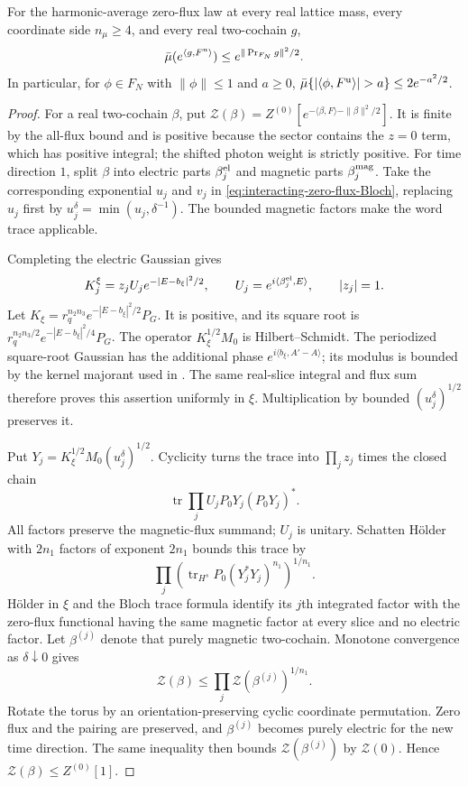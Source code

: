 \documentclass[11pt,letterpaper,reqno]{amsart}
\DeclareMathOperator{\tr}{tr}
\begin{document}
\begin{proposition}\label{prop:interacting-zero-flux-domination}
For the harmonic-average zero-flux law at every
real lattice mass, every coordinate side
$n_\mu\ge4$, and every real two-cochain $g$,
\begin{equation}\label{eq:interacting-zero-flux-Gaussian}
 \bar\mu(e^{\langle g,F^{\rm u}\rangle})
                  \le e^{\|\operatorname{Pr}_{F_N}g\|^2/2}.
\end{equation}
In particular, for $\phi\in F_N$ with
$\|\phi\|\le1$ and $a\ge0$,
$\bar\mu\{|\langle\phi,F^{\rm u}\rangle|>a\}\le2e^{-a^2/2}$.
\end{proposition}

\begin{proof}
For a real two-cochain $\beta$, put $\mathcal Z(\beta)=
Z^{(0)}[e^{-\langle\beta,F\rangle-\|\beta\|^2/2}]$.
It is finite by the all-flux bound and is
positive because the sector contains the
$z=0$ term, which has positive integral;
the shifted photon weight is strictly positive.
For time direction $1$, split $\beta$
into electric parts $\beta_j^{\rm el}$ and
magnetic parts $\beta_j^{\rm mag}$.
Take the corresponding exponential $u_j$
and $v_j$ in
\eqref{eq:interacting-zero-flux-Bloch}, replacing
$u_j$ first by $u_j^\delta=\min(u_j,\delta^{-1})$.
The bounded magnetic factors make the
word trace applicable.

Completing the electric Gaussian gives
\[
 K_j^\xi=z_jU_j e^{-|E-b_\xi|^2/2},\qquad
 U_j=e^{i\langle\beta_j^{\rm el},E\rangle},\qquad
 |z_j|=1 .
\]
Let $K_\xi=r_q^{n_2n_3}e^{-|E-b_\xi|^2/2}P_G$.
It is positive, and its square root is
$r_q^{n_2n_3/2}e^{-|E-b_\xi|^2/4}P_G$.
The operator $K_\xi^{1/2}M_0$ is Hilbert--Schmidt.
The periodized square-root Gaussian has the
additional phase $e^{i\langle b_\xi,A'-A\rangle}$;
its modulus is bounded by the kernel majorant
used in \cite[(83)]{ChamberLattice}.
The same real-slice integral and flux sum
therefore proves this assertion uniformly
in $\xi$. Multiplication by bounded
$(u_j^\delta)^{1/2}$ preserves it.

Put $Y_j=K_\xi^{1/2}M_0(u_j^\delta)^{1/2}$.
Cyclicity turns the trace into
$\prod_jz_j$ times the closed chain
\[
 \tr\prod_j U_jP_0Y_j(P_0Y_j)^*.
\]
All factors preserve the magnetic-flux
summand; $U_j$ is unitary. Schatten Hölder
\cite[slides~53--56]{PongeSchatten2025}
with $2n_1$ factors of exponent $2n_1$
bounds this trace by
\[
 \prod_j\left(\tr_{H^s}P_0(Y_j^*Y_j)^{n_1}\right)^{1/n_1}.
\]
Hölder in $\xi$ and the Bloch trace formula
identify its $j$th integrated factor with
the zero-flux functional having the same
magnetic factor at every slice and no
electric factor. Let $\beta^{(j)}$ denote
that purely magnetic two-cochain. Monotone
convergence as $\delta\downarrow0$ gives
\[
 \mathcal Z(\beta)\le
                \prod_j\mathcal Z(\beta^{(j)})^{1/n_1}.
\]
Rotate the torus by an orientation-preserving
cyclic coordinate permutation. Zero flux
and the pairing are preserved, and
$\beta^{(j)}$ becomes purely electric for
the new time direction. The same inequality
then bounds $\mathcal Z(\beta^{(j)})$
by $\mathcal Z(0)$. Hence
$\mathcal Z(\beta)\le Z^{(0)}[1]$.


\end{proof}
\end{document}
